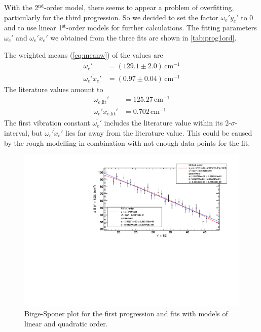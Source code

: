 With the 2$^\text{nd}$-order model, there seems to appear a problem of overfitting,
particularly for the third progression.
So we decided to set the factor $\omega_e' y_e'$ to 0 and to use linear 1$^\text{st}$-order models
for further calculations.
The fitting parameters $\omega_e'$ and $\omega_e' x_e'$ we obtained from the three fits
are shown in \autoref{tab:prog1ord}.

The weighted means (\autoref{eq:meanw}) of the values are
\begin{equation}
\begin{split}
    \overline{\omega_e'}		&   = (129.1 \pm 2.0)\,\text{cm}^{-1}\\
    \overline{\omega_e' x_e'} 	&	= (0.97 \pm 0.04)\,\text{cm}^{-1}
  \end{split}
\end{equation}
The literature values \cite{steinfeld} amount to
\begin{equation}
\begin{split}
    \omega_{e\text{,lit}}'			&   = 125.27\,\text{cm}^{-1}\\
    \omega_e' x_{e\text{,lit}}' 	&	= 0.702\,\text{cm}^{-1}
  \end{split}
\end{equation}
The first vibration constant $\overline{\omega_e'}$ includes the literature value within its 2-$\sigma$-interval, but
$\overline{\omega_e' x_e'}$ lies far away from the literature value. This could be caused by the rough
modelling in combination with not enough data points for the fit.



\begin{figure}[H]
\begin{center}
  \includegraphics[width=\textwidth]{../img/prog1_birgesponer.pdf}
  \caption[---]{Birge-Sponer plot for the first progression and fits with models of linear and quadratic order.}
  \label{img:prog1}
\end{center}
\end{figure}


